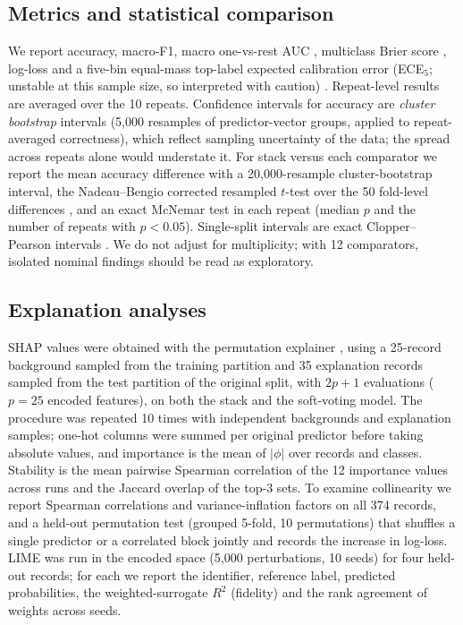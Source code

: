 \documentclass[11pt,a4paper]{article}
\begin{document}
\subsection{Metrics and statistical comparison}\label{sec:stats}
We report accuracy, macro-F1, macro one-vs-rest AUC \citep{fawcett2006}, multiclass Brier score \citep{brier1950}, log-loss and a five-bin equal-mass top-label expected calibration error (ECE$_5$; unstable at this sample size, so interpreted with caution) \citep{guo2017}. Repeat-level results are averaged over the 10 repeats. Confidence intervals for accuracy are \emph{cluster bootstrap} intervals (5{,}000 resamples of predictor-vector groups, applied to repeat-averaged correctness), which reflect sampling uncertainty of the data; the spread across repeats alone would understate it. For stack versus each comparator we report the mean accuracy difference with a 20{,}000-resample cluster-bootstrap interval, the Nadeau--Bengio corrected resampled $t$-test over the 50 fold-level differences \citep{nadeau2003}, and an exact McNemar test \citep{dietterich1998} in each repeat (median $p$ and the number of repeats with $p<0.05$). Single-split intervals are exact Clopper--Pearson intervals \citep{clopper1934}. We do not adjust for multiplicity; with 12 comparators, isolated nominal findings should be read as exploratory.

\subsection{Explanation analyses}
SHAP values were obtained with the permutation explainer \citep{lundberg2017}, using a 25-record background sampled from the training partition and 35 explanation records sampled from the test partition of the original split, with $2p+1$ evaluations ($p=25$ encoded features), on both the stack and the soft-voting model. The procedure was repeated 10 times with independent backgrounds and explanation samples; one-hot columns were summed per original predictor before taking absolute values, and importance is the mean of $|\phi|$ over records and classes. Stability is the mean pairwise Spearman correlation of the 12 importance values across runs and the Jaccard overlap of the top-3 sets. To examine collinearity we report Spearman correlations and variance-inflation factors on all 374 records, and a held-out permutation test (grouped 5-fold, 10 permutations) that shuffles a single predictor or a correlated block jointly and records the increase in log-loss. LIME \citep{ribeiro2016} was run in the encoded space (5{,}000 perturbations, 10 seeds) for four held-out records; for each we report the identifier, reference label, predicted probabilities, the weighted-surrogate $R^2$ (fidelity) and the rank agreement of weights across seeds.
\end{document}
